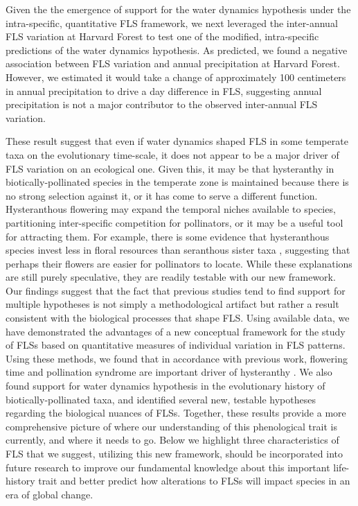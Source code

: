 \documentclass{article}
\begin{document}
{\noindent Given the the emergence of support for the water dynamics hypothesis under the intra-specific, quantitative FLS framework, we next leveraged the inter-annual FLS variation at Harvard Forest to test one of the modified, intra-specific predictions of the water dynamics hypothesis. As predicted, we found a negative association between FLS variation and annual precipitation at Harvard Forest. However, we estimated it would take a change of approximately 100 centimeters in annual precipitation to drive a day difference in FLS, suggesting annual precipitation is not a major contributor to the observed inter-annual FLS variation.

These result suggest that even if water dynamics shaped FLS in some temperate taxa on the evolutionary time-scale, it does not appear to be a major driver of FLS variation on an ecological one. Given this, it may be that hysteranthy in biotically-pollinated species in the temperate zone is maintained because there is no strong selection against it, or it has come to serve a different function. Hysteranthous flowering may expand the temporal niches available to species, partitioning inter-specific competition for pollinators, or it may be a useful tool for attracting them. For example, there is some evidence that hysteranthous species invest less in floral resources than seranthous sister taxa \citep{Gunatilleke1984}, suggesting that perhaps their flowers are easier for pollinators to locate. While these explanations are still purely speculative, they are readily testable with our new framework.\\

\noindent Our findings suggest that the fact that previous studies tend to find support for multiple hypotheses \citep{Bolmgren2003,Gougherty2018,Savage2019} is not simply a methodological artifact but rather a result consistent with the biological processes that shape FLS. Using available data, we have demonstrated the advantages of a new conceptual framework for the study of FLSs based on quantitative measures of individual variation in FLS patterns. Using these methods, we found that in accordance with previous work, flowering time and pollination syndrome are important driver of hysteranthy \citep{Gougherty2018}. We also found support for water dynamics hypothesis in the evolutionary history of biotically-pollinated taxa, and identified several new, testable hypotheses regarding the biological nuances of FLSs. Together, these results provide a more comprehensive picture of where our understanding of this phenological trait is currently, and where it needs to go. Below we highlight three characteristics of FLS that we suggest, utilizing this new framework, should be incorporated into future research to improve our fundamental knowledge about this important life-history trait and better predict how alterations to FLSs will impact species in an era of global change.
}
\end{document}
